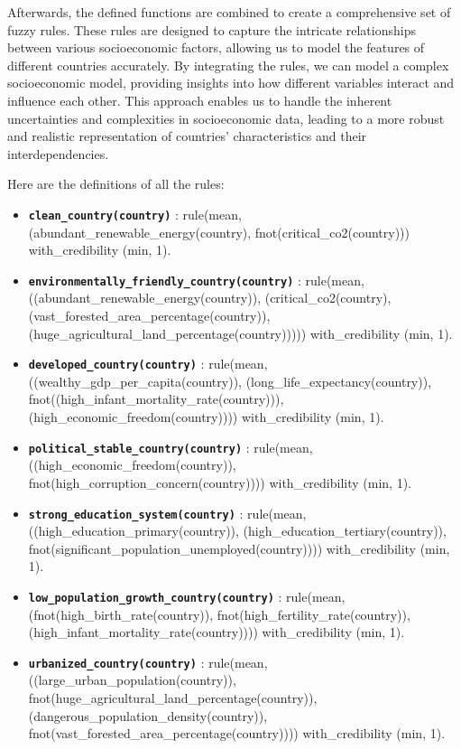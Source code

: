 \documentclass[fleqn,11pt]{article}
\begin{document}
Afterwards, the defined functions are combined to create a comprehensive set of fuzzy rules. These rules are designed to capture the intricate relationships between various socioeconomic factors, allowing us to model the features of different countries accurately. By integrating the rules, we can model a complex socioeconomic model, providing insights into how different variables interact and influence each other. This approach enables us to handle the inherent uncertainties and complexities in socioeconomic data, leading to a more robust and realistic representation of countries' characteristics and their interdependencies.

Here are the definitions of all the rules:
\begin{itemize}
    \raggedright
    \item \texttt{\textbf{clean\_country(country)}} : rule(mean, (abundant\_renewable\_energy(country), fnot(critical\_co2(country))) with\_credibility (min, 1).
    \item \texttt{\textbf{environmentally\_friendly\_country(country)}} : rule(mean, ((abundant\_renewable\_energy(country)), (critical\_co2(country), (vast\_forested\_area\_percentage(country)), (huge\_agricultural\_land\_percentage(country))))) with\_credibility (min, 1).
    \item \texttt{\textbf{developed\_country(country)}} : rule(mean, ((wealthy\_gdp\_per\_capita(country)), (long\_life\_expectancy(country)), fnot((high\_infant\_mortality\_rate(country))), (high\_economic\_freedom(country)))) with\_credibility (min, 1).
    \item \texttt{\textbf{political\_stable\_country(country)}} : rule(mean, ((high\_economic\_freedom(country)), fnot(high\_corruption\_concern(country)))) with\_credibility (min, 1).
    \item \texttt{\textbf{strong\_education\_system(country)}} : rule(mean, ((high\_education\_primary(country)), (high\_education\_tertiary(country)), fnot(significant\_population\_unemployed(country)))) with\_credibility (min, 1).
    \item \texttt{\textbf{low\_population\_growth\_country(country)}} : rule(mean, (fnot(high\_birth\_rate(country)), fnot(high\_fertility\_rate(country)), (high\_infant\_mortality\_rate(country)))) with\_credibility (min, 1).
    \item \texttt{\textbf{urbanized\_country(country)}} : rule(mean, ((large\_urban\_population(country)), fnot(huge\_agricultural\_land\_percentage(country)), (dangerous\_population\_density(country)), fnot(vast\_forested\_area\_percentage(country)))) with\_credibility (min, 1).

\end{itemize}
\end{document}
